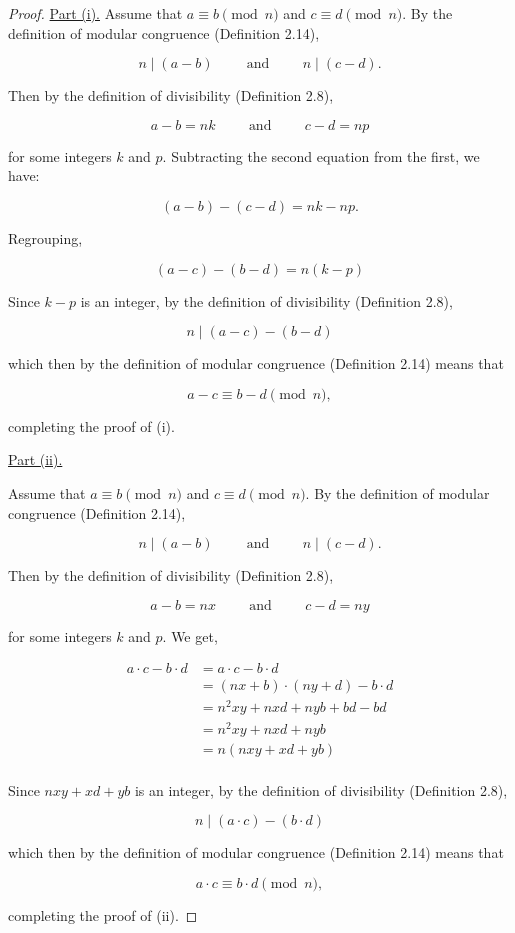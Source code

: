 \documentclass{article}
\begin{document}
\begin{proof}
\underline{Part (i).} Assume that $a \equiv b \pmod{n}$ and $c \equiv d \pmod{n}$. By the definition of modular congruence (Definition 2.14), 

\[
    n \mid (a - b) \hspace{1cm} \text{and} \hspace{1cm} n \mid (c - d).
\]

Then by the definition of divisibility (Definition 2.8),

\[
    a - b = nk \hspace{1cm} \text{and} \hspace{1cm} c - d = np
\]

for some integers $k$ and $p$. Subtracting the second equation from the first, we have:

\[(a-b)-(c-d)=nk-np.\]

Regrouping,

\[(a-c)-(b-d)=n(k-p)\]

Since $k-p$ is an integer, by the definition of divisibility (Definition 2.8),

\[n \mid (a-c)-(b-d)\]

which then by the definition of modular congruence (Definition 2.14) means that

\[a-c \equiv b-d \pmod{n},\]

completing the proof of (i).

\newpage

\underline{Part (ii).} 

Assume that $a \equiv b \pmod{n}$ and $c \equiv d \pmod{n}$. By the definition of modular congruence (Definition 2.14), 

\[
    n \mid (a - b) \hspace{1cm} \text{and} \hspace{1cm} n \mid (c - d).
\]

Then by the definition of divisibility (Definition 2.8),

\[
    a - b = nx \hspace{1cm} \text{and} \hspace{1cm} c - d = ny
\]

for some integers $k$ and $p$. We get,

\begin{align*}
    a\cdot c - b \cdot d &= a\cdot c - b \cdot d \\
    &= (nx+b) \cdot (ny+d) - b \cdot d \\
    &= n^2xy+nxd+nyb+bd-bd\\
    &= n^2xy+nxd+nyb\\
    &= n(nxy+xd+yb)\\
\end{align*}

Since $nxy+xd+yb$ is an integer, by the definition of divisibility (Definition 2.8),

\[n \mid (a\cdot c)-(b\cdot d)\]

which then by the definition of modular congruence (Definition 2.14) means that

\[a\cdot c \equiv b \cdot d \pmod{n},\]

completing the proof of (ii).
\end{proof}
\end{document}
